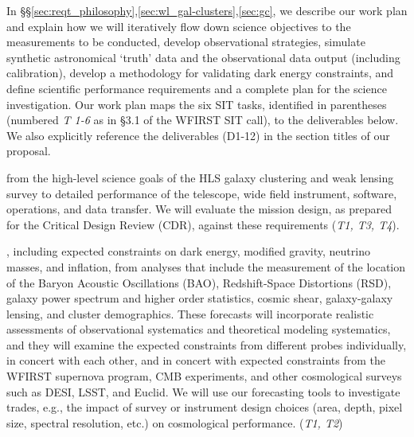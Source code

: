 %
%


In \S\S \ref{sec:reqt_philosophy},\ref{sec:wl_gal-clusters},\ref{sec:gc}, we
describe our work plan and explain how we will iteratively flow down science objectives to the
measurements to be conducted, develop observational strategies,
simulate synthetic astronomical `truth' data and the observational
data output (including calibration), develop a methodology for
validating dark energy constraints, and define scientific performance
requirements and a complete plan for the science investigation. 
Our work plan maps the six SIT tasks,  identified in parentheses  (numbered \textit{T 1-6} as in \S 3.1 of the WFIRST SIT call), to the deliverables below. 
We also explicitly reference  the deliverables (D1-12) in the section titles of our proposal. 



 from the high-level science goals of the
HLS galaxy clustering and weak lensing survey to detailed performance
of the telescope, wide field instrument, software, operations, and
data transfer.  We will evaluate the mission design, as prepared for
the Critical Design Review (CDR), against these requirements (\textit{T1, T3, T4}). 

, including expected constraints on dark energy,
modified gravity, neutrino masses, and inflation, from analyses that
include the measurement of the location of the Baryon Acoustic
Oscillations (BAO), Redshift-Space Distortions (RSD), galaxy power
spectrum and higher order statistics, cosmic shear, galaxy-galaxy
lensing, and cluster demographics. These forecasts will incorporate realistic assessments of observational
systematics and theoretical modeling systematics, and they will examine the expected constraints from different probes individually,
in concert with each other, and in concert with expected constraints
from the WFIRST supernova program, CMB experiments, and other cosmological
surveys such as DESI, LSST, and Euclid.  
We will use our forecasting tools to investigate trades,
e.g., the impact of survey or instrument design choices (area, depth,
pixel size, spectral resolution, etc.) on cosmological performance. (\textit{T1, T2})

